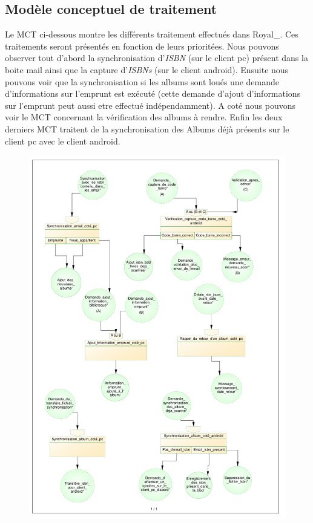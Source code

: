 \subsection{Modèle conceptuel de traitement}

Le MCT ci-dessous montre les différents traitement effectués dans Royal\_. 
Ces traitements seront présentés en fonction de leurs prioritées.
Nous pouvons observer tout d'abord la synchronisation d'\emph{ISBN} (sur le client pc) présent dans la boite mail ainsi que la capture d'\emph{ISBNs} (sur le client android).
Ensuite nous pouvons voir que la synchronisation si les albums sont loués une demande d'informations sur l'emprunt est exécuté (cette demande d'ajout d'informations sur l'emprunt peut aussi etre effectué indépendamment).
A coté nous pouvons voir le MCT concernant la vérification des albums à rendre.
Enfin les deux derniers MCT traitent de la synchronisation des Albums déjà présents sur le client pc avec le client android.


\begin{figure}[h!]
\begin{center}
\includegraphics[width=14cm]{MCT_Royal.pdf}
\end{center}
\end{figure}
\newpage{}


